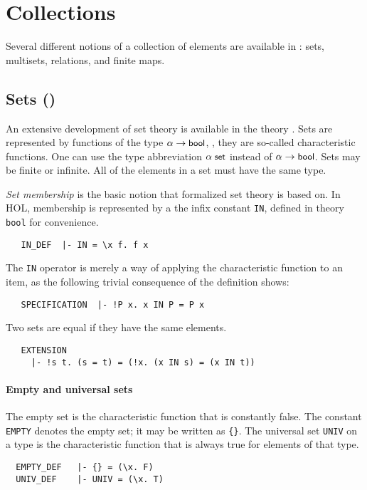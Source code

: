 \section{Collections}

Several different notions of a collection of elements are available in
\HOL: sets, multisets, relations, and finite maps.

\subsection{Sets ()}

An extensive development of set theory is available in the theory
. Sets are represented by functions of the type
$\alpha \to \mbox{\small{\textbf{\sf{bool}}}}$, \ie, they are so-called characteristic
functions.
%
%
One can use the type abbreviation $\alpha\; \mbox{\small{\textbf{\sf{set}}}}$
instead of $\alpha \to \mbox{\small{\textbf{\sf{bool}}}}$. Sets may be finite or
infinite. All of the elements in a set must have the same type.

\emph{Set membership} is the basic notion that formalized set theory
is based on. In HOL, membership is represented by a the infix constant
{\small\verb+IN+}, defined in theory {\small\verb+bool+} for
convenience.
%
{\small
\begin{verbatim}
   IN_DEF  |- IN = \x f. f x
\end{verbatim}
}
%
The {\small\verb+IN+} operator is merely a way of applying the
characteristic function to an item, as the following
trivial consequence of the definition shows:
%
{\small
\begin{verbatim}
   SPECIFICATION  |- !P x. x IN P = P x
\end{verbatim}
}
%
\noindent Two sets are equal if they have the same elements.
%
{\small
\begin{verbatim}
   EXTENSION
     |- !s t. (s = t) = (!x. (x IN s) = (x IN t))
\end{verbatim}
}

\paragraph{Empty and universal sets}

The empty set is the characteristic function that is constantly
false. The constant {\small\verb+EMPTY+} denotes the empty set; it may
be written as {\small\verb+{}+}. The universal set {\small\verb+UNIV+}
on a type is the characteristic function that is always true for
elements of that type.
%
{\small
\begin{verbatim}
  EMPTY_DEF   |- {} = (\x. F)
  UNIV_DEF    |- UNIV = (\x. T)
\end{verbatim}
}
%
